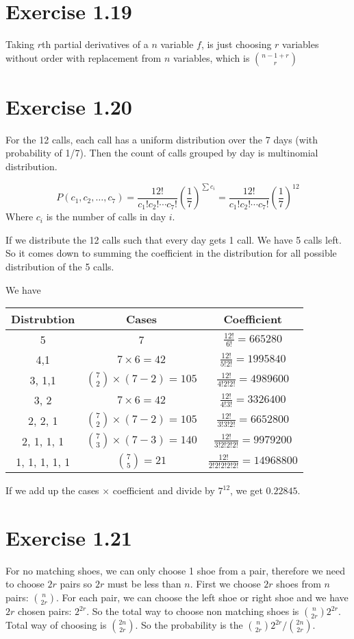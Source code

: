 \documentclass[12pt]{article}
\begin{document}
\section*{Exercise 1.19}
Taking $r$th partial derivatives of a $n$ variable $f$, is just choosing $r$ variables without order with replacement from $n$ variables, which is ${n-1 + r \choose r}$

\section*{Exercise 1.20}
For the 12 calls, each call has a uniform distribution over the 7 days (with probability of 1/7). Then the count of calls grouped by day is multinomial distribution. 

$$P(c_1, c_2, \ldots, c_7) = \frac{12!}{c_1!c_2!\cdots c_7!} \left(\frac{1}{7}\right)^{\sum c_i} =  \frac{12!}{c_1!c_2!\cdots c_7!} \left(\frac{1}{7}\right)^{12}$$
Where $c_i$ is the number of calls in day $i$.

If we distribute the 12 calls such that every day gets 1 call. We have 5 calls left. So it comes down to summing the coefficient in the distribution for all possible distribution of the 5 calls.

We have
\begin{center}
	\begin{tabular}{| c |c |c| }
		\hline
		Distrubtion & Cases & Coefficient \\ 
		\hline
		5 & 7 & $\frac{12!}{6!} = 665280$ \\  
		\hline
		4,1 & $7 \times 6 = 42$ & $\frac{12!}{5!2!}= 1995840$  \\
		\hline
		3, 1,1 & ${7 \choose 2} \times (7-2) = 105 $ &  $\frac{12!}{4!2!2!}= 4989600$ \\
		\hline
		3, 2 &  $7 \times 6 = 42$ & $\frac{12!}{4!3!}=3326400$ \\
		\hline
		2, 2, 1&  ${7 \choose 2} \times (7-2) = 105 $ & $\frac{12!}{3!3!2!} = 6652800$ \\
		\hline
		2, 1, 1, 1&  ${7 \choose 3} \times (7-3) = 140$ & $\frac{12!}{3!2!2!2!} = 9979200$ \\
		\hline
		1, 1, 1, 1, 1&  ${7 \choose 5 }= 21$ & $\frac{12!}{2!2!2!2!2!} = 14968800$ \\
		\hline
	\end{tabular}
\end{center}
If we add up the cases $\times$ coefficient and divide by $7^{12}$, we get $0.22845$.

\section*{Exercise 1.21}
For no matching shoes, we can only choose 1 shoe from a pair, therefore we need to choose $2r$ pairs so $2r$ must be less than $n$. First we choose $2r$ shoes from $n$ pairs: ${n \choose 2r}$. For each pair, we can choose the left shoe or right shoe and we have $2r$ chosen pairs: $2^{2r}$. So the total way to choose non matching shoes is ${n \choose 2r} 2^{2r}$.  Total way of choosing is ${2n \choose 2r}$. So the probability is the ${n \choose 2r} 2^{2r} / {2n \choose 2r}$.
\end{document}
